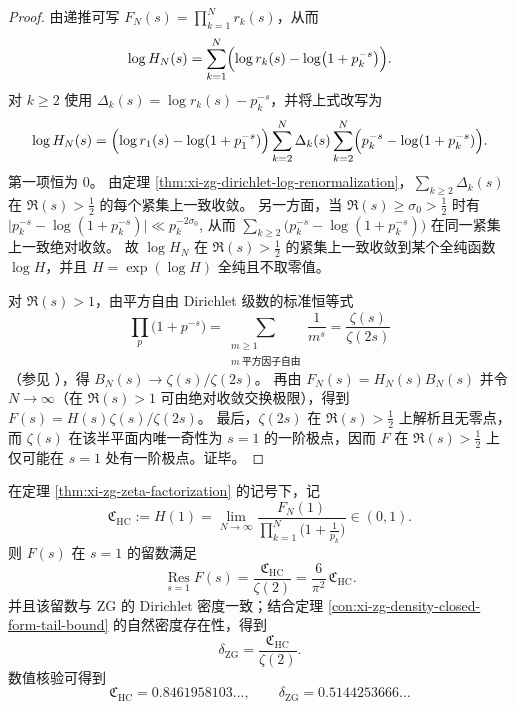 \begin{proof}
由递推可写 \(F_N(s)=\prod_{k=1}^{N}r_k(s)\)，从而
\[
\log H_N(s)
=\sum_{k=1}^{N}\Bigl(\log r_k(s)-\log\bigl(1+p_k^{-s}\bigr)\Bigr).
\]
对 \(k\ge 2\) 使用 \(\Delta_k(s)=\log r_k(s)-p_k^{-s}\)，并将上式改写为
\[
\log H_N(s)
=\Bigl(\log r_1(s)-\log(1+p_1^{-s})\Bigr)
\sum_{k=2}^{N}\Delta_k(s)
\sum_{k=2}^{N}\Bigl(p_k^{-s}-\log(1+p_k^{-s})\Bigr).
\]
第一项恒为 \(0\)。
由定理 \ref{thm:xi-zg-dirichlet-log-renormalization}，\(\sum_{k\ge 2}\Delta_k(s)\) 在 \(\Re(s)>\tfrac12\) 的每个紧集上一致收敛。
另一方面，当 \(\Re(s)\ge \sigma_0>\tfrac12\) 时有
\(
\bigl|p_k^{-s}-\log(1+p_k^{-s})\bigr|
\ll p_k^{-2\sigma_0}
\),
从而 \(\sum_{k\ge 2}\bigl(p_k^{-s}-\log(1+p_k^{-s})\bigr)\) 在同一紧集上一致绝对收敛。
故 \(\log H_N\) 在 \(\Re(s)>\tfrac12\) 的紧集上一致收敛到某个全纯函数 \(\log H\)，并且 \(H=\exp(\log H)\) 全纯且不取零值。

对 \(\Re(s)>1\)，由平方自由 Dirichlet 级数的标准恒等式
\[
\prod_{p}\bigl(1+p^{-s}\bigr)
=\sum_{\substack{m\ge 1\\ m\ \text{平方因子自由}}}\frac1{m^s}
=\frac{\zeta(s)}{\zeta(2s)}
\]
（参见 \cite{Apostol1976,Titchmarsh1986RiemannZeta}），得 \(B_N(s)\to \zeta(s)/\zeta(2s)\)。
再由 \(F_N(s)=H_N(s)B_N(s)\) 并令 \(N\to\infty\)（在 \(\Re(s)>1\) 可由绝对收敛交换极限），得到 \(F(s)=H(s)\zeta(s)/\zeta(2s)\)。
最后，\(\zeta(2s)\) 在 \(\Re(s)>\tfrac12\) 上解析且无零点，而 \(\zeta(s)\) 在该半平面内唯一奇性为 \(s=1\) 的一阶极点，因而 \(F\) 在 \(\Re(s)>\tfrac12\) 上仅可能在 \(s=1\) 处有一阶极点。证毕。
\end{proof}



\begin{corollary}[素数路径硬核常数与 \texorpdfstring{$s=1$}{s=1} 留数]\label{cor:xi-zg-hardcore-constant-residue}
在定理 \ref{thm:xi-zg-zeta-factorization} 的记号下，记
\[
\mathfrak C_{\mathrm{HC}}:=H(1)=\lim_{N\to\infty}\frac{F_N(1)}{\prod_{k=1}^{N}\bigl(1+\frac1{p_k}\bigr)}\in(0,1).
\]
则 \(F(s)\) 在 \(s=1\) 的留数满足
\[
\operatorname*{Res}_{s=1}F(s)=\frac{\mathfrak C_{\mathrm{HC}}}{\zeta(2)}=\frac{6}{\pi^2}\,\mathfrak C_{\mathrm{HC}}.
\]
并且该留数与 \(\mathrm{ZG}\) 的 Dirichlet 密度一致；结合定理 \ref{con:xi-zg-density-closed-form-tail-bound} 的自然密度存在性，得到
\[
\delta_{\mathrm{ZG}}=\frac{\mathfrak C_{\mathrm{HC}}}{\zeta(2)}.
\]
数值核验可得到
\[
\mathfrak C_{\mathrm{HC}}=0.8461958103\ldots,
\qquad
\delta_{\mathrm{ZG}}=0.5144253666\ldots
\]
\end{corollary}


